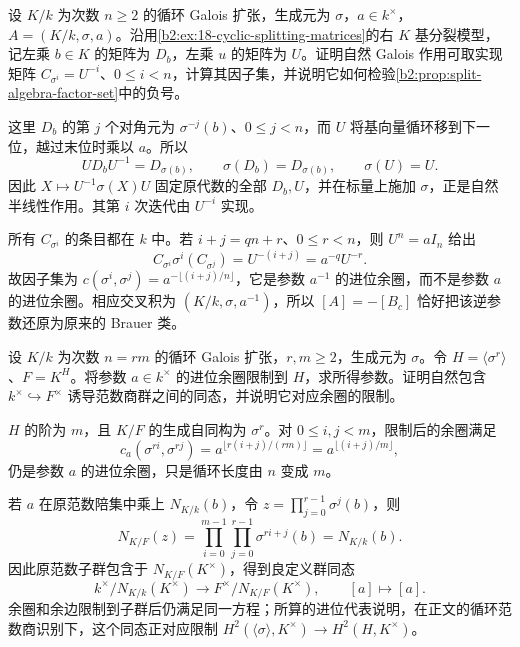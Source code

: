 \begin{exercise}\label{b2:ex:18-factor-set-changes}
	设 \(K/k\) 为次数 \(n\ge2\) 的循环 Galois 扩张，生成元为 \(\sigma\)，\(a\in k^\times\)，\(A=(K/k,\sigma,a)\)。沿用\cref{b2:ex:18-cyclic-splitting-matrices}的右 \(K\) 基分裂模型，记左乘 \(b\in K\) 的矩阵为 \(D_b\)，左乘 \(u\) 的矩阵为 \(U\)。证明自然 Galois 作用可取实现矩阵 \(C_{\sigma^i}=U^{-i}\)、\(0\le i<n\)，计算其因子集，并说明它如何检验\cref{b2:prop:split-algebra-factor-set}中的负号。
\end{exercise}
\begin{solution}
	这里 \(D_b\) 的第 \(j\) 个对角元为 \(\sigma^{-j}(b)\)、\(0\le j<n\)，而 \(U\) 将基向量循环移到下一位，越过末位时乘以 \(a\)。所以
	\[
		U D_bU^{-1}=D_{\sigma(b)},\qquad \sigma(D_b)=D_{\sigma(b)},\qquad \sigma(U)=U.
	\]
	因此 \(X\mapsto U^{-1}\sigma(X)U\) 固定原代数的全部 \(D_b,U\)，并在标量上施加 \(\sigma\)，正是自然半线性作用。其第 \(i\) 次迭代由 \(U^{-i}\) 实现。

	所有 \(C_{\sigma^i}\) 的条目都在 \(k\) 中。若 \(i+j=qn+r\)、\(0\le r<n\)，则 \(U^n=aI_n\) 给出
	\[
		C_{\sigma^i}\sigma^i(C_{\sigma^j}) =U^{-(i+j)}=a^{-q}U^{-r}.
	\]
	故因子集为 \(c(\sigma^i,\sigma^j)=a^{-\lfloor(i+j)/n\rfloor}\)，它是参数 \(a^{-1}\) 的进位余圈，而不是参数 \(a\) 的进位余圈。相应交叉积为 \((K/k,\sigma,a^{-1})\)，所以 \([A]=-[B_c]\) 恰好把该逆参数还原为原来的 Brauer 类。
\end{solution}

\begin{exercise}\label{b2:ex:18-cyclic-cohomology}
	设 \(K/k\) 为次数 \(n=rm\) 的循环 Galois 扩张，\(r,m\ge2\)，生成元为 \(\sigma\)。令 \(H=\langle\sigma^r\rangle\)、\(F=K^H\)。将参数 \(a\in k^\times\) 的进位余圈限制到 \(H\)，求所得参数。证明自然包含 \(k^\times\hookrightarrow F^\times\) 诱导范数商群之间的同态，并说明它对应余圈的限制。
\end{exercise}
\begin{solution}
	\(H\) 的阶为 \(m\)，且 \(K/F\) 的生成自同构为 \(\sigma^r\)。对 \(0\le i,j<m\)，限制后的余圈满足
	\[
		c_a(\sigma^{ri},\sigma^{rj}) =a^{\lfloor r(i+j)/(rm)\rfloor} =a^{\lfloor(i+j)/m\rfloor},
	\]
	仍是参数 \(a\) 的进位余圈，只是循环长度由 \(n\) 变成 \(m\)。

	若 \(a\) 在原范数陪集中乘上 \(N_{K/k}(b)\)，令 \(z=\prod_{j=0}^{r-1}\sigma^j(b)\)，则
	\[
		N_{K/F}(z) =\prod_{i=0}^{m-1}\prod_{j=0}^{r-1}\sigma^{ri+j}(b) =N_{K/k}(b).
	\]
	因此原范数子群包含于 \(N_{K/F}(K^\times)\)，得到良定义群同态
	\[
		k^\times/N_{K/k}(K^\times) \longrightarrow F^\times/N_{K/F}(K^\times), \qquad [a]\longmapsto[a].
	\]
	余圈和余边限制到子群后仍满足同一方程；所算的进位代表说明，在正文的循环范数商识别下，这个同态正对应限制 \(H^2(\langle\sigma\rangle,K^\times)\to H^2(H,K^\times)\)。
\end{solution}

